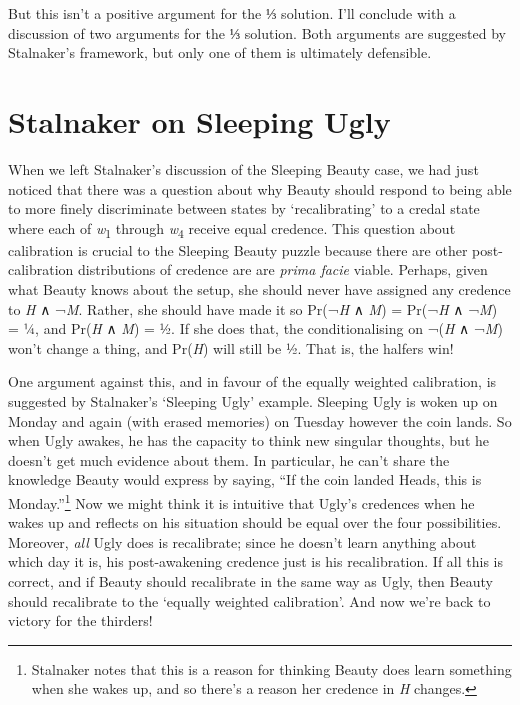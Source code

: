\documentclass[
  10pt,
  letterpaper,
  DIV=11,
  numbers=noendperiod,
  twoside]{scrartcl}
\begin{document}
But this isn't a positive argument for the ⅓ solution. I'll conclude
with a discussion of two arguments for the ⅓ solution. Both arguments
are suggested by Stalnaker's framework, but only one of them is
ultimately defensible.

\section{Stalnaker on Sleeping Ugly}\label{stalnaker-on-sleeping-ugly}

When we left Stalnaker's discussion of the Sleeping Beauty case, we had
just noticed that there was a question about why Beauty should respond
to being able to more finely discriminate between states by
`recalibrating' to a credal state where each of
\emph{w}\textsubscript{1} through \emph{w}\textsubscript{4} receive
equal credence. This question about calibration is crucial to the
Sleeping Beauty puzzle because there are other post-calibration
distributions of credence are are \emph{prima facie} viable. Perhaps,
given what Beauty knows about the setup, she should never have assigned
any credence to \emph{H} ∧ ¬\emph{M}. Rather, she should have made it so
Pr(¬\emph{H} ∧ \emph{M}) = Pr(¬\emph{H} ∧ ¬\emph{M}) = ¼, and
Pr(\emph{H} ∧ \emph{M}) = ½. If she does that, the conditionalising on
¬(\emph{H} ∧ ¬\emph{M}) won't change a thing, and Pr(\emph{H}) will
still be ½. That is, the halfers win!

One argument against this, and in favour of the equally weighted
calibration, is suggested by Stalnaker's `Sleeping Ugly' example.
Sleeping Ugly is woken up on Monday and again (with erased memories) on
Tuesday however the coin lands. So when Ugly awakes, he has the capacity
to think new singular thoughts, but he doesn't get much evidence about
them. In particular, he can't share the knowledge Beauty would express
by saying, ``If the coin landed Heads, this is Monday.''\footnote{Stalnaker
  notes that this is a reason for thinking Beauty does learn something
  when she wakes up, and so there's a reason her credence in \emph{H}
  changes.} Now we might think it is intuitive that Ugly's credences
when he wakes up and reflects on his situation should be equal over the
four possibilities. Moreover, \emph{all} Ugly does is recalibrate; since
he doesn't learn anything about which day it is, his post-awakening
credence just is his recalibration. If all this is correct, and if
Beauty should recalibrate in the same way as Ugly, then Beauty should
recalibrate to the `equally weighted calibration'. And now we're back to
victory for the thirders!
\end{document}
